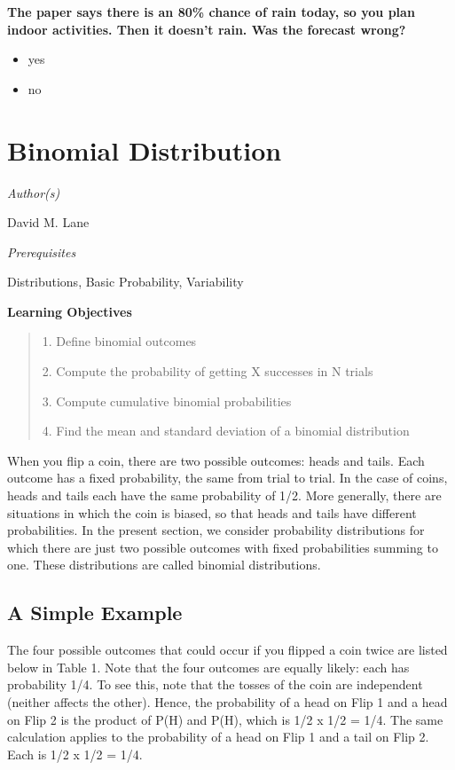 \documentclass[
  11pt,
,
onecolumn,
openany
]{book}
\begin{document}
\textbf{The paper says there is an 80\% chance of rain today, so you plan
indoor activities. Then it doesn't rain. Was the forecast wrong?}

\begin{itemize}
\item
  yes
\item
  no
\end{itemize}

\hypertarget{binomial-distribution}{%
\chapter{Binomial Distribution}\label{binomial-distribution}}

\emph{Author(s)}

David M. Lane

\emph{Prerequisites}

Distributions, Basic Probability, Variability

\textbf{Learning Objectives}

\begin{quote}
1. Define binomial outcomes

2. Compute the probability of getting X successes in N trials

3. Compute cumulative binomial probabilities

4. Find the mean and standard deviation of a binomial distribution
\end{quote}

When you flip a coin, there are two possible outcomes: heads and tails. Each
outcome has a fixed probability, the same from trial to trial. In the case of
coins, heads and tails each have the same probability of 1/2. More generally,
there are situations in which the coin is biased, so that heads and tails have
different probabilities. In the present section, we consider probability
distributions for which there are just two possible outcomes with fixed
probabilities summing to one. These distributions are called binomial
distributions.

\hypertarget{a-simple-example}{%
\section{A Simple Example}\label{a-simple-example}}

The four possible outcomes that could occur if you flipped a coin twice are
listed below in Table 1. Note that the four outcomes are equally likely: each
has probability 1/4. To see this, note that the tosses of the coin are
independent (neither affects the other). Hence, the probability of a head on
Flip 1 and a head on Flip 2 is the product of P(H) and P(H), which is 1/2 x
1/2 = 1/4. The same calculation applies to the probability of a head on Flip 1
and a tail on Flip 2. Each is 1/2 x 1/2 = 1/4.
\end{document}
